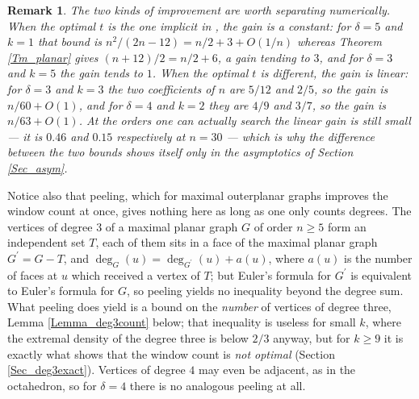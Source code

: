 \documentclass[10pt,a4paper]{article}
\newtheorem{remark}[theorem]{Remark}
\begin{document}
\begin{remark}
\label{Rem_clz}The two kinds of improvement are worth separating numerically.
When the optimal $t$ is the one implicit in \cite{CaroLauriZarb}, the gain is a
constant: for $\delta =5$ and $k=1$ that bound is $n^{2}/(2n-12)=n/2+3+O(1/n)$
whereas Theorem \ref{Tm_planar} gives $(n+12)/2=n/2+6$, a gain tending to $3$,
and for $\delta =3$ and $k=5$ the gain tends to $1$. When the optimal $t$ is
different, the gain is linear: for $\delta =3$ and $k=3$ the two coefficients of
$n$ are $5/12$ and $2/5$, so the gain is $n/60+O(1)$, and for $\delta =4$ and
$k=2$ they are $4/9$ and $3/7$, so the gain is $n/63+O(1)$. At the orders one
can actually search the linear gain is still small --- it is $0.46$ and $0.15$
respectively at $n=30$ --- which is why the difference between the two bounds
shows itself only in the asymptotics of Section \ref{Sec_asym}.
\end{remark}



Notice also that peeling, which for maximal outerplanar graphs improves the window count at once, gives nothing here
as long as one only counts degrees. The vertices of degree $3$ of a maximal planar graph $G$ of order $n\geq 5$
form an independent set $T$, each of them sits in a face of the maximal planar graph $G^{\prime }=G-T$, and
$\deg _{G}(u)=\deg _{G^{\prime }}(u)+a(u)$, where $a(u)$ is the number of faces at $u$ which received a
vertex of $T$; but Euler's formula for $G^{\prime }$ is equivalent to Euler's formula for $G$, so
peeling yields no inequality beyond the degree sum. What peeling does yield is a bound on the \emph{number} of
vertices of degree three, Lemma \ref{Lemma_deg3count} below; that inequality is useless for small $k$, where
the extremal density of the degree three is below $2/3$ anyway, but for $k\geq 9$ it is exactly what shows
that the window count is \emph{not optimal} (Section \ref{Sec_deg3exact}). Vertices of degree $4$ may even be
adjacent, as in the octahedron, so for $\delta =4$ there is no analogous peeling at all.
\end{document}
